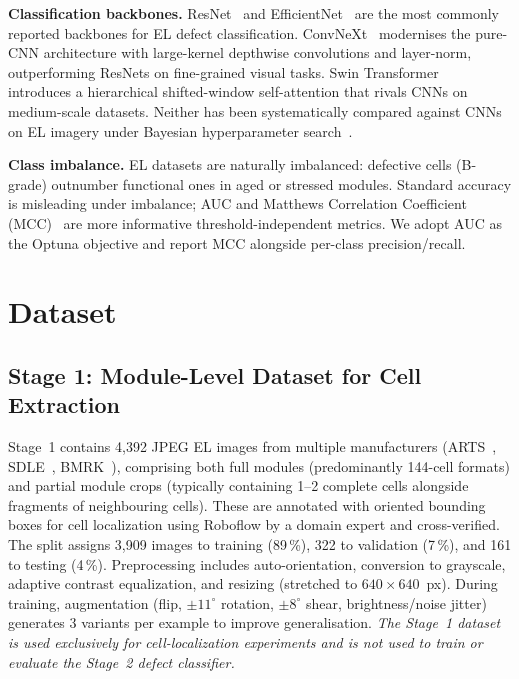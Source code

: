 \documentclass[conference]{IEEEtran}
\begin{document}
\textbf{Classification backbones.} ResNet~\cite{he2016} and EfficientNet~\cite{tan2019} are the most commonly reported backbones for EL defect classification. ConvNeXt~\cite{liu2022} modernises the pure-CNN architecture with large-kernel depthwise convolutions and layer-norm, outperforming ResNets on fine-grained visual tasks. Swin Transformer~\cite{liu2021} introduces a hierarchical shifted-window self-attention that rivals CNNs on medium-scale datasets. Neither has been systematically compared against CNNs on EL imagery under Bayesian hyperparameter search~\cite{akiba2019}.

\textbf{Class imbalance.} EL datasets are naturally imbalanced: defective cells (B-grade) outnumber functional ones in aged or stressed modules. Standard accuracy is misleading under imbalance; AUC and Matthews Correlation Coefficient (MCC)~\cite{deitsch2019} are more informative threshold-independent metrics. We adopt AUC as the Optuna objective and report MCC alongside per-class precision/recall.

\section{Dataset}
\label{sec:dataset}

\subsection{Stage 1: Module-Level Dataset for Cell Extraction}
Stage~1 contains 4{,}392 JPEG EL images from multiple manufacturers (ARTS~\cite{dataset_arts}, SDLE~\cite{dataset_sdle}, BMRK~\cite{dataset_bmrk}), comprising both full modules (predominantly 144-cell formats) and partial module crops (typically containing 1--2 complete cells alongside fragments of neighbouring cells). These are annotated with oriented bounding boxes for cell localization using Roboflow by a domain expert and cross-verified. The split assigns 3{,}909 images to training (89\,\%), 322 to validation (7\,\%), and 161 to testing (4\,\%). Preprocessing includes auto-orientation, conversion to grayscale, adaptive contrast equalization, and resizing (stretched to $640\times640$~px). During training, augmentation (flip, $\pm11^\circ$ rotation, $\pm8^\circ$ shear, brightness/noise jitter) generates 3 variants per example to improve generalisation. \textit{The Stage~1 dataset is used exclusively for cell-localization experiments and is not used to train or evaluate the Stage~2 defect classifier.}
\end{document}

